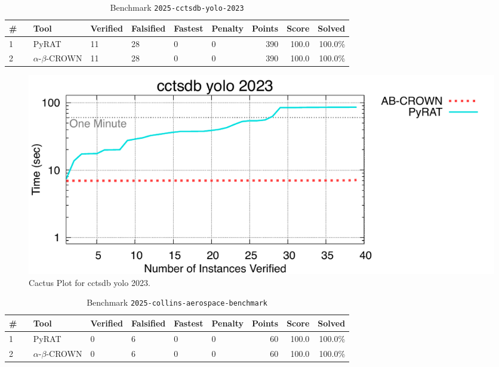 
\clearpage

\begin{table}[h]
\begin{center}
\caption{Benchmark \texttt{2025-cctsdb-yolo-2023}} \label{tab:cat_2025_cctsdb_yolo_2023}
{\setlength{\tabcolsep}{2pt}
\begin{tabular}[h]{@{}llllllrrr@{}}
\toprule
\textbf{\# ~} & \textbf{Tool} & \textbf{Verified} & \textbf{Falsified} & \textbf{Fastest} & \textbf{Penalty} & \textbf{Points} & \textbf{Score} & \textbf{Solved}\\
\midrule
1 & PyRAT & 11 & 28 & 0 & 0 & 390 & 100.0 & 100.0\% \\
2 & $\alpha$-$\beta$-CROWN & 11 & 28 & 0 & 0 & 390 & 100.0 & 100.0\% \\
\bottomrule
\end{tabular}
}
\end{center}
\end{table}



\begin{figure}[h]
\centerline{\includegraphics[width=\textwidth]{cactus/2025_cctsdb_yolo_2023.pdf}}
\caption{Cactus Plot for cctsdb yolo 2023.}
\label{fig:quantPic}
\end{figure}


\clearpage

\begin{table}[h]
\begin{center}
\caption{Benchmark \texttt{2025-collins-aerospace-benchmark}} \label{tab:cat_2025_collins_aerospace_benchmark}
{\setlength{\tabcolsep}{2pt}
\begin{tabular}[h]{@{}llllllrrr@{}}
\toprule
\textbf{\# ~} & \textbf{Tool} & \textbf{Verified} & \textbf{Falsified} & \textbf{Fastest} & \textbf{Penalty} & \textbf{Points} & \textbf{Score} & \textbf{Solved}\\
\midrule
1 & PyRAT & 0 & 6 & 0 & 0 & 60 & 100.0 & 100.0\% \\
2 & $\alpha$-$\beta$-CROWN & 0 & 6 & 0 & 0 & 60 & 100.0 & 100.0\% \\
\bottomrule
\end{tabular}
}
\end{center}
\end{table}



